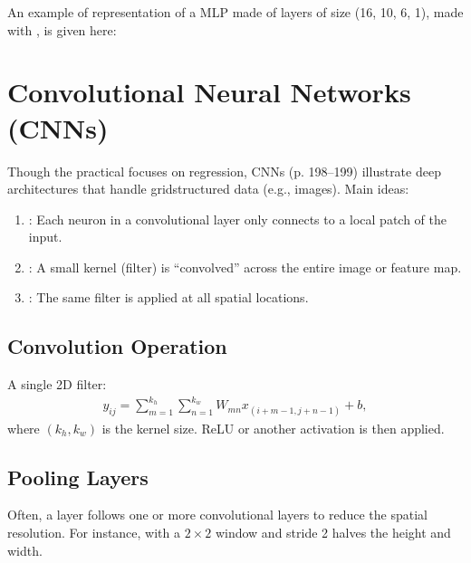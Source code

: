 \documentclass[letterpaper,10pt,english]{jupyterBook}
\begin{document}
\sphinxAtStartPar
An example of representation of a MLP made of layers of size (16, 10, 6, 1), made with , is given here:

\sphinxAtStartPar
{}


\section{Convolutional Neural Networks (CNNs)}
\label{\detokenize{04:convolutional-neural-networks-cnns}}
\sphinxAtStartPar
Though the practical focuses on regression, CNNs (p. 198–199) illustrate deep architectures that handle grid\sphinxhyphen{}structured data (e.g., images). Main ideas:
\begin{enumerate}
%
\item {} 
\sphinxAtStartPar
{}: Each neuron in a convolutional layer only connects to a local patch of the input.

\item {} 
\sphinxAtStartPar
{}: A small kernel (filter) is “convolved” across the entire image or feature map.

\item {} 
\sphinxAtStartPar
{}: The same filter is applied at all spatial locations.

\end{enumerate}


\subsection{Convolution Operation}
\label{\detokenize{04:convolution-operation}}
\sphinxAtStartPar
A single 2D filter:
\begin{equation*}
\begin{split}
y_{ij} = \sum_{m=1}^{k_h} \sum_{n=1}^{k_w} W_{mn} x_{(i + m - 1, j + n - 1)} + b,
\end{split}
\end{equation*}
\sphinxAtStartPar
where \((k_h, k_w)\) is the kernel size. ReLU or another activation is then applied.


\subsection{Pooling Layers}
\label{\detokenize{04:pooling-layers}}
\sphinxAtStartPar
Often, a  layer follows one or more convolutional layers to reduce the spatial resolution. For instance,  with a \(2\times2\) window and stride 2 halves the height and width.
\end{document}
